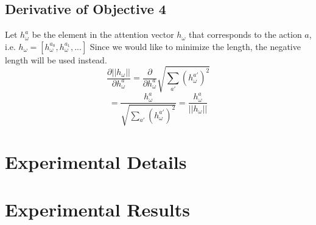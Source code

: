 \documentclass{article}
\begin{document}
	\subsection{Derivative of Objective 4}
	Let $h_\omega^a$ be the element in the attention vector $h_\omega$ that corresponds to the action $a$, i.e. $h_\omega = [h_\omega^{a_0}, h_\omega^{a_1}, ...]$
	Since we would like to minimize the length, the negative length will be used instead.
	$$\frac{\partial ||h_\omega||}{\partial h_\omega^a} = \frac{\partial}{\partial h_\omega^a} \sqrt{\sum_{a'} (h_\omega^{a'})^2}$$
	$$= \frac{h_\omega^a}{\sqrt{\sum_{a'} (h_\omega^{a'})^2}} = \frac{h_\omega^a}{||h_\omega||}$$
	\section{Experimental Details}
	\section{Experimental Results}
\end{document}
